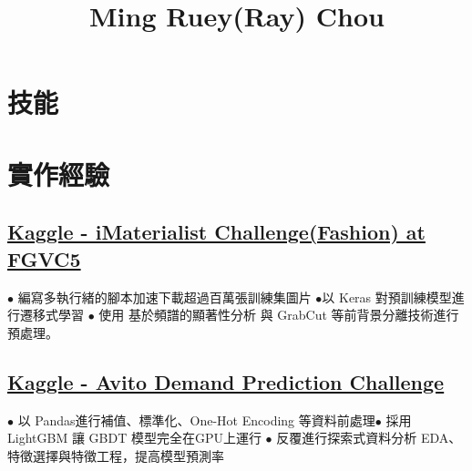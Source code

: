 \documentclass[11pt,a4paper]{moderncv}
\title{Ming Ruey(Ray) Chou}
\begin{document}
\maketitle
\vspace*{-14mm}

\section{技能}
\vspace{-0.6\baselineskip}

\section{實作經驗}

\subsection{\href{https://www.kaggle.com/c/imaterialist-challenge-fashion-2018}{Kaggle - iMaterialist Challenge(Fashion) at FGVC5}}
{\footnotesize{$\bullet$ 編寫多執行緒的腳本加速下載超過百萬張訓練集圖片\space\space 
$\bullet$以 Keras 對預訓練模型進行遷移式學習 \newline $\bullet$ 使用 基於頻譜的顯著性分析 與 GrabCut 等前背景分離技術進行預處理。}}

\subsection{\href{https://www.kaggle.com/c/avito-demand-prediction}{Kaggle - Avito Demand Prediction Challenge}}
{\footnotesize{$\bullet$ 以 Pandas進行補值、標準化、One-Hot Encoding 等資料前處理\space\space $\bullet$ 採用 LightGBM 讓 GBDT 模型完全在GPU上運行
\newline $\bullet$ 反覆進行探索式資料分析 EDA、特徵選擇與特徵工程，提高模型預測率}}
\end{document}
